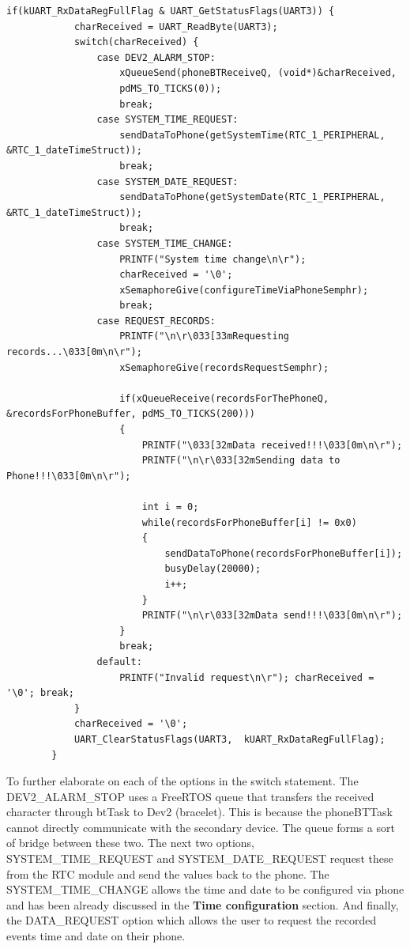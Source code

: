 \documentclass[12pt,a4paper]{article}
\begin{document}
        \begin{lstlisting}[label={lst:phoneBTTaskSwitch}, caption=Phone request resolution]
        if(kUART_RxDataRegFullFlag & UART_GetStatusFlags(UART3)) {
            charReceived = UART_ReadByte(UART3);
            switch(charReceived) {
                case DEV2_ALARM_STOP: 		
                    xQueueSend(phoneBTReceiveQ, (void*)&charReceived,
                    pdMS_TO_TICKS(0)); 
                    break;
                case SYSTEM_TIME_REQUEST: 	
                    sendDataToPhone(getSystemTime(RTC_1_PERIPHERAL, &RTC_1_dateTimeStruct));
                    break;
                case SYSTEM_DATE_REQUEST: 	
                    sendDataToPhone(getSystemDate(RTC_1_PERIPHERAL, &RTC_1_dateTimeStruct));
                    break;
                case SYSTEM_TIME_CHANGE:	
                    PRINTF("System time change\n\r");
                    charReceived = '\0';
                    xSemaphoreGive(configureTimeViaPhoneSemphr);
                    break;
                case REQUEST_RECORDS:		
                    PRINTF("\n\r\033[33mRequesting records...\033[0m\n\r");
                    xSemaphoreGive(recordsRequestSemphr);

                    if(xQueueReceive(recordsForThePhoneQ, &recordsForPhoneBuffer, pdMS_TO_TICKS(200)))
                    {
                        PRINTF("\033[32mData received!!!\033[0m\n\r");
                        PRINTF("\n\r\033[32mSending data to Phone!!!\033[0m\n\r");

                        int i = 0;
                        while(recordsForPhoneBuffer[i] != 0x0)
                        {
                            sendDataToPhone(recordsForPhoneBuffer[i]);
                            busyDelay(20000);
                            i++;
                        }
                        PRINTF("\n\r\033[32mData send!!!\033[0m\n\r");
                    }
                    break;
                default:					
                    PRINTF("Invalid request\n\r"); charReceived = '\0'; break;
            } 
            charReceived = '\0';
            UART_ClearStatusFlags(UART3,  kUART_RxDataRegFullFlag);
        } 
        \end{lstlisting}

    To further elaborate on each of the options in the switch statement. The DEV2\_ALARM\_STOP uses a FreeRTOS queue that transfers the received character through btTask to Dev2 (bracelet). This is because the phoneBTTask cannot directly communicate with the secondary device. The queue forms a sort of bridge between these two.
    The next two options, SYSTEM\_TIME\_REQUEST and SYSTEM\_DATE\_REQUEST request these from the RTC module and send the values back to the phone.
    The SYSTEM\_TIME\_CHANGE allows the time and date to be configured via phone and has been already discussed in the {\bfseries Time configuration} section.
    And finally, the DATA\_REQUEST option which allows the user to request the recorded events time and date on their phone.
\end{document}
